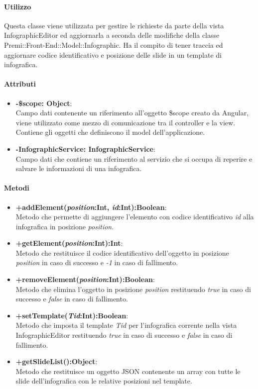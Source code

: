 	\paragraph{Utilizzo} 
	
		Questa classe viene utilizzata per gestire le richieste da parte della vista InfographicEditor ed aggiornarla a seconda delle modifiche della classe Premi::Front-End::Model::Infographic.
		Ha il compito di tener traccia ed aggiornare codice identificativo e posizione delle slide in un template di infografica.
	\paragraph{Attributi}
	\begin{itemize}
		\item \textbf{-\$scope: Object}:\\
			Campo dati contenente un riferimento all'oggetto \$scope creato da Angular, viene utilizzato come mezzo di comunicazione tra il controller e la view. Contiene gli oggetti che definiscono il model dell'applicazione.
		\item \textbf{-InfographicService: InfographicService}:\\
			Campo dati che contiene un riferimento al servizio che si occupa di reperire e salvare le informazioni di una infografica.
	\end{itemize}
	
	\paragraph{Metodi}
	\begin{itemize}
	  \item \textbf{+addElement(\textit{position}:Int, \textit{id}:Int):Boolean}:\\
		  Metodo che permette di aggiungere l'elemento con codice identificativo \textit{id} alla infografica in posizione \textit{position}.
	  \item \textbf{+getElement(\textit{position}:Int):Int}:\\
		  Metodo che restituisce il codice identificativo dell'oggetto in posizione \textit{position} in caso di successo e \textit{-1} in caso di fallimento.
	  \item \textbf{+removeElement(\textit{position}:Int):Boolean}:\\
		  Metodo che elimina l'oggetto in posizione \textit{position} restituendo \textit{true} in caso di successo e \textit{false} in caso di fallimento.
	  \item \textbf{+setTemplate(\textit{Tid}:Int):Boolean}:\\
		  Metodo che imposta il template \textit{Tid} per l'infografica corrente nella vista InfographicEditor restituendo \textit{true} in caso di successo e \textit{false} in caso di fallimento.
	  \item \textbf{+getSlideList():Object}:\\
		  Metodo che restituisce un oggetto JSON contenente un array con tutte le slide dell'infografica con le relative posizioni nel template.
		  
	\end{itemize}
